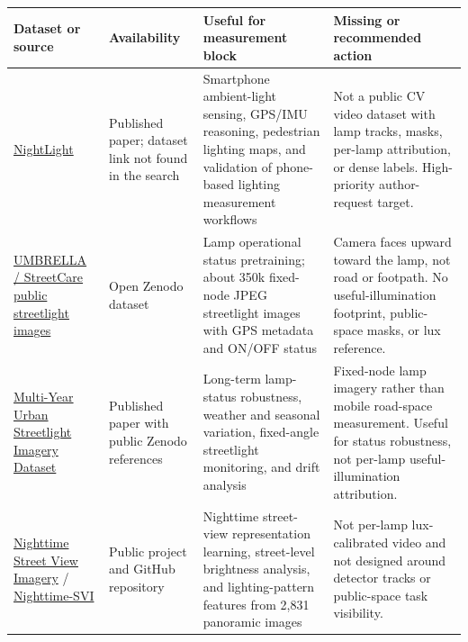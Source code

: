 \documentclass[11pt]{article}
\renewcommand{\arraystretch}{1.18}
\begin{document}
\begingroup
\scriptsize
\setlength{\tabcolsep}{3pt}
\renewcommand{\arraystretch}{1.12}
\begin{center}
\begin{tabularx}{\textwidth}{>{\raggedright\arraybackslash}p{}>{\raggedright\arraybackslash}p{}>{\raggedright\arraybackslash}X>{\raggedright\arraybackslash}p{}}
\toprule
Dataset or source & Availability & Useful for measurement block & Missing or recommended action \\
\midrule
\href{https://par.nsf.gov/servlets/purl/10635625}{NightLight} & Published paper; dataset link not found in the search & Smartphone ambient-light sensing, GPS/IMU reasoning, pedestrian lighting maps, and validation of phone-based lighting measurement workflows & Not a public CV video dataset with lamp tracks, masks, per-lamp attribution, or dense labels. High-priority author-request target. \\
\href{https://zenodo.org/records/6046758}{UMBRELLA / StreetCare public streetlight images} & Open Zenodo dataset & Lamp operational status pretraining; about 350k fixed-node JPEG streetlight images with GPS metadata and ON/OFF status & Camera faces upward toward the lamp, not road or footpath. No useful-illumination footprint, public-space masks, or lux reference. \\
\href{https://arxiv.org/abs/2512.12205}{Multi-Year Urban Streetlight Imagery Dataset} & Published paper with public Zenodo references & Long-term lamp-status robustness, weather and seasonal variation, fixed-angle streetlight monitoring, and drift analysis & Fixed-node lamp imagery rather than mobile road-space measurement. Useful for status robustness, not per-lamp useful-illumination attribution. \\
\href{https://ual.sg/publication/2024-scs-night-svi/}{Nighttime Street View Imagery} / \href{https://github.com/fzc961020/Nighttime-SVI}{Nighttime-SVI} & Public project and GitHub repository & Nighttime street-view representation learning, street-level brightness analysis, and lighting-pattern features from 2,831 panoramic images & Not per-lamp lux-calibrated video and not designed around detector tracks or public-space task visibility. \\
\bottomrule
\end{tabularx}
\end{center}
\end{document}
